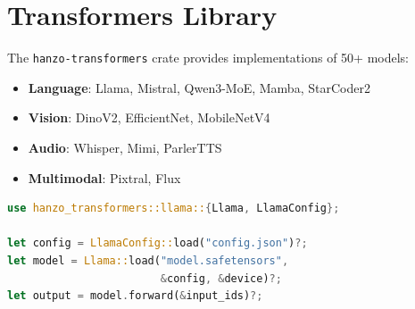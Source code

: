 \section{Transformers Library}


The \texttt{hanzo-transformers} crate provides implementations of 50+ models:

\begin{itemize}
    \item \textbf{Language}: Llama, Mistral, Qwen3-MoE, Mamba, StarCoder2
    \item \textbf{Vision}: DinoV2, EfficientNet, MobileNetV4
    \item \textbf{Audio}: Whisper, Mimi, ParlerTTS
    \item \textbf{Multimodal}: Pixtral, Flux
\end{itemize}

\begin{lstlisting}[language=Rust]
use hanzo_transformers::llama::{Llama, LlamaConfig};

let config = LlamaConfig::load("config.json")?;
let model = Llama::load("model.safetensors",
                        &config, &device)?;
let output = model.forward(&input_ids)?;
\end{lstlisting}


